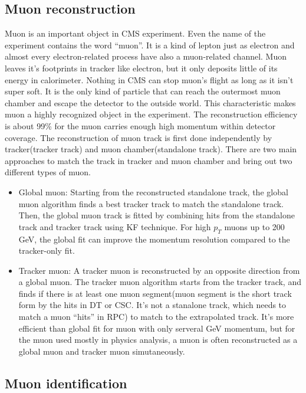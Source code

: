 \subsection{Muon reconstruction}
Muon is an important object in CMS experiment. Even the name of the experiment contains the word ``muon''. It is a kind of lepton just as electron and almost every electron-related process have also a muon-related channel. Muon leaves it's footprints in tracker like electron, but it only deposits little of its energy in calorimeter. Nothing in CMS can stop muon's flight as long as it isn't super soft. It is the only kind of particle that can reach the outermost muon chamber and escape the detector to the outside world. This characteristic makes muon a highly recognized object in the experiment. The reconstruction efficiency is about 99\% for the muon carries enough high momentum within detector coverage\cite{mureco}.\newline
The reconstruction of muon track is first done independently by tracker(tracker track) and muon chamber(standalone track). There are two main approaches to match the track in tracker and muon chamber and bring out two different types of muon.
\begin{itemize}
\item Global muon: Starting from the reconstructed standalone track, the global muon algorithm finds a best tracker track to match the standalone track. Then, the global muon track is fitted by combining hits from the standalone track and tracker track using KF technique\cite{trkreco}. For high $p_{T}$ muons up to 200 GeV, the global fit can improve the momentum resolution compared to the tracker-only fit\cite{mureco}.
\item Tracker muon: A tracker muon is reconstructed by an opposite direction from a global muon. The tracker muon algorithm starts from the tracker track, and finds if there is at least one muon segment(muon segment is the short track form by the hits in DT or CSC. It's not a stanalone track, which needs to match a muon ``hits'' in RPC) to match to the extrapolated track. It's  more efficient than global fit for muon with only serveral GeV momentum, but for the muon used mostly in physics analysis, a muon is often reconstructed as a global muon and tracker muon simutaneously\cite{mureco}.   
\end{itemize}   

\subsection{Muon identification}

